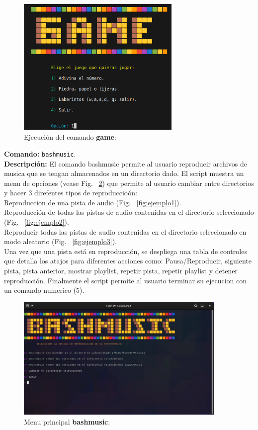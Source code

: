 \documentclass[titlepage]{article}
\begin{document}
\begin{figure}[H]
    \centering
    \includegraphics[width=0.7\textwidth]{game.png}
    \caption{Ejecución del comando \textbf{game}:}
    \label{fig:ejemplo}
\end{figure}

\noindent
\textbf{Comando:} \verb|bashmusic|. \\
\textbf{Descripción:} El comando bashmusic permite al usuario reproducir archivos de musica que se tengan almacenados en un directorio dado. El script muestra un menu de opciones (vease Fig.~ \ref{fig:ejemplo0}) que permite al usuario cambiar entre directorios y hacer 3 direfentes tipos de reproduccioón: \\Reproduccion de una pista de audio (Fig.~ \ref{fig:ejemplo1}).\\Reproducción de todas las pistas de audio contenidas en el directorio seleccionado (Fig.~ \ref{fig:ejemplo2}).\\Reproducir todas las pistas de audio contenidas en el directorio seleccionado en modo aleatorio (Fig.~ \ref{fig:ejemplo3}).\\Una vez que una pista está en reproducción, se despliega una tabla de controles que detalla los atajos para diferentes acciones como: Pausa/Reproducir, siguiente pista, pista anterior, mostrar playlist, repetir pista, repetir playlist y detener reproducción. Finalmente el script permite al usuario terminar su ejecucion con un comando numerico (5).           

\begin{figure}[H]
    \centering
    \includegraphics[width=0.9\textwidth]{bashmusic_mp.png}
    \caption{Menu principal \textbf{bashmusic}:}
    \label{fig:ejemplo0}
\end{figure}
\end{document}
